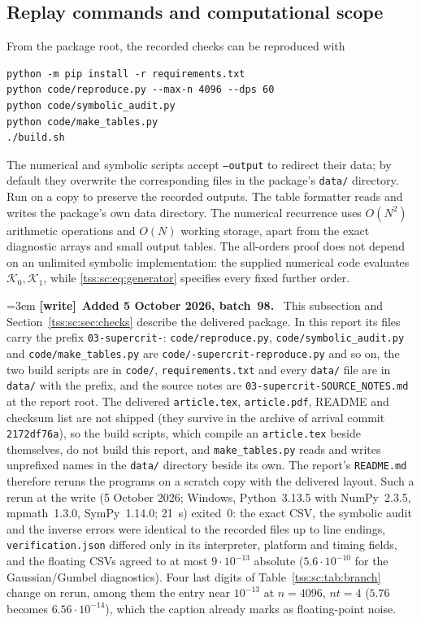 \documentclass[11pt]{article}
\theoremstyle{remark}\newtheorem{remark}[theorem]{Remark}
\theoremstyle{definition}\newtheorem{definition}[theorem]{Definition}
\newcommand{\Kc}{\mathcal K}
\newenvironment{writenote}[1][]{\par\smallskip\begingroup\small\emergencystretch=3em
 \noindent\textbf{[write]}\if\relax\detokenize{#1}\relax\else~\textbf{#1.}\fi\ }%
 {\par\endgroup\smallskip}
\begin{document}
\subsection{Replay commands and computational scope}
From the package root, the recorded checks can be reproduced with
\begin{verbatim}
python -m pip install -r requirements.txt
python code/reproduce.py --max-n 4096 --dps 60
python code/symbolic_audit.py
python code/make_tables.py
./build.sh
\end{verbatim}
The numerical and symbolic scripts accept \texttt{--output} to redirect their data; by default they overwrite the corresponding files in the package's \texttt{data/} directory. Run on a copy to preserve the recorded outputs. The table formatter reads and writes the package's own data directory. The numerical recurrence uses $O(N^2)$ arithmetic operations and $O(N)$ working storage, apart from the exact diagnostic arrays and small output tables. The all-orders proof does not depend on an unlimited symbolic implementation: the supplied numerical code evaluates $\Kc_0,\Kc_1$, while \eqref{tss:sc:eq:generator} specifies every fixed further order.

\begin{writenote}[Added 5 October 2026, batch~98]
This subsection and Section~\ref{tss:sc:sec:checks} describe the delivered
package. In this report its files carry the prefix
\texttt{03-supercrit-}: \texttt{code/\allowbreak reproduce.py},
\texttt{code/\allowbreak symbolic\_audit.py} and
\texttt{code/\allowbreak make\_tables.py} are
\texttt{code/-supercrit-reproduce.py} and so on, the two
build scripts are in \texttt{code/}, \texttt{requirements.txt} and every
\texttt{data/} file are in \texttt{data/} with the prefix, and the source
notes are \texttt{03-supercrit-SOURCE\_NOTES.md} at the report root. The
delivered \texttt{article.tex}, \texttt{article.pdf}, README and checksum
list are not shipped (they survive in the archive of arrival commit
\texttt{2172df76a}), so the build scripts, which compile an
\texttt{article.tex} beside themselves, do not build this report, and
\texttt{make\_tables.py} reads and writes unprefixed names in the
\texttt{data/} directory beside its own. The report's \texttt{README.md}
therefore reruns the programs on a scratch copy with the delivered layout.
Such a rerun at the write (5 October 2026; Windows, Python~3.13.5 with
NumPy~2.3.5, mpmath~1.3.0, SymPy~1.14.0; 21~s) exited~0: the exact CSV,
the symbolic audit and the inverse errors were identical to the recorded
files up to line endings, \texttt{verification.json} differed only in its
interpreter, platform and timing fields, and the floating CSVs agreed to
at most $9\cdot10^{-13}$ absolute ($5.6\cdot10^{-10}$ for the
Gaussian/Gumbel diagnostics). Four last digits of Table~\ref{tss:sc:tab:branch}
change on rerun, among them the entry near $10^{-13}$ at $n=4096$, $nt=4$
($5.76$ becomes $6.56\cdot10^{-14}$), which the caption already marks as
floating-point noise.
\end{writenote}
\end{document}

